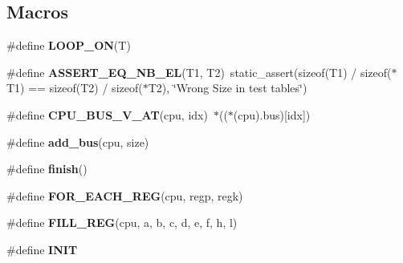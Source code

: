 \subsection*{Macros}
\begin{DoxyCompactItemize}
\item 
\#define {\bfseries L\+O\+O\+P\+\_\+\+ON}(T)
\item 
\mbox{\label{unit-test-cpu_8c_a412e475035f76eb4fed2cfd999c8d89c}} 
\#define {\bfseries A\+S\+S\+E\+R\+T\+\_\+\+E\+Q\+\_\+\+N\+B\+\_\+\+EL}(T1,  T2)~static\+\_\+assert(sizeof(T1) / sizeof($\ast$T1) == sizeof(T2) / sizeof($\ast$T2), \char`\"{}Wrong Size in test tables\char`\"{})
\item 
\mbox{\label{unit-test-cpu_8c_a94ac54ac8dcaf9afceaec7f667b8a2ea}} 
\#define {\bfseries C\+P\+U\+\_\+\+B\+U\+S\+\_\+\+V\+\_\+\+AT}(cpu,  idx)~$\ast$(($\ast$(cpu).bus)\mbox{[}idx\mbox{]})
\item 
\#define {\bfseries add\+\_\+bus}(cpu,  size)
\item 
\#define {\bfseries finish}()
\item 
\#define {\bfseries F\+O\+R\+\_\+\+E\+A\+C\+H\+\_\+\+R\+EG}(cpu,  regp,  regk)
\item 
\#define {\bfseries F\+I\+L\+L\+\_\+\+R\+EG}(cpu,  a,  b,  c,  d,  e,  f,  h,  l)
\item 
\#define {\bfseries I\+N\+IT}
\end{DoxyCompactItemize}
